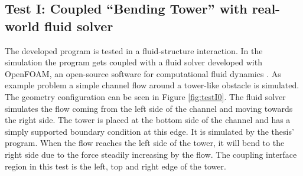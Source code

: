  \subsection{Test I: Coupled ``Bending Tower'' with real-world fluid solver}\label{sec:valid-I}
  The developed program is tested in a fluid-structure interaction. In the simulation the program gets coupled with a fluid solver developed with OpenFOAM, an open-source software for computational fluid dynamics \cite{openfoam-url}. As example problem a simple channel flow around a tower-like obstacle is simulated. The geometry configuration can be seen in Figure \ref{fig:testI0}. The fluid solver simulates the flow coming from the left side of the channel and moving towards the right side. The tower is placed at the bottom side of the channel and has a simply supported boundary condition at this edge. It is simulated by the thesis' program. When the flow reaches the left side of the tower, it will bend to the right side due to the force steadily increasing by the flow. The coupling interface region in this test is the left, top and right edge of the tower.
  
